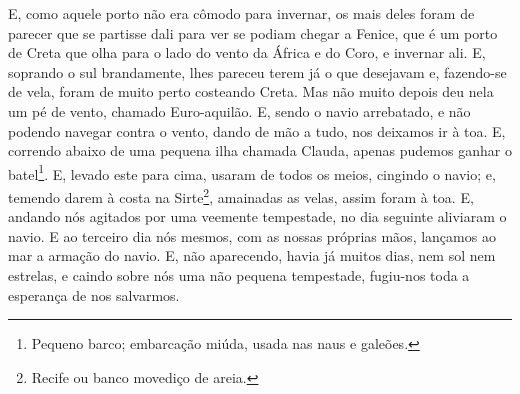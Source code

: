 E, como aquele porto não era cômodo para invernar, os mais deles
foram de parecer que se partisse dali para ver se podiam chegar a
Fenice, que é um porto de Creta que olha para o lado do vento da
África e do Coro, e invernar ali. E, soprando o sul
brandamente, lhes pareceu terem já o que desejavam e, fazendo-se de
vela, foram de muito perto costeando Creta. Mas não muito
depois deu nela um pé de vento, chamado Euro-aquilão. E,
sendo o navio arrebatado, e não podendo navegar contra o vento,
dando de mão a tudo, nos deixamos ir à toa. E, correndo
abaixo de uma pequena ilha chamada Clauda, apenas pudemos ganhar o
batel\footnote{Pequeno barco; embarcação miúda, usada nas naus e
galeões.}. E, levado este para cima, usaram de todos os
meios, cingindo o navio; e, temendo darem à costa na
Sirte\footnote{Recife ou banco movediço de areia.}, amainadas as
velas, assim foram à toa. E, andando nós agitados por uma
veemente tempestade, no dia seguinte aliviaram o navio. E ao
terceiro dia nós mesmos, com as nossas próprias mãos, lançamos ao
mar a armação do navio. E, não aparecendo, havia já muitos
dias, nem sol nem estrelas, e caindo sobre nós uma não pequena
tempestade, fugiu-nos toda a esperança de nos salvarmos.

